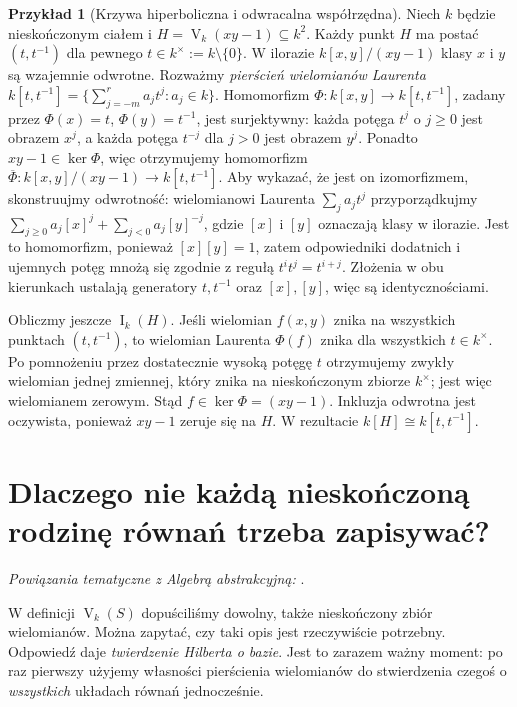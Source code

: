 \documentclass[11pt,a4paper,openany]{report}
\numberwithin{equation}{section}
\theoremstyle{plain}
\theoremstyle{definition}
\newtheorem{przyklad}[twierdzenie]{Przykład}
\theoremstyle{remark}
\newcommand{\V}{\operatorname V}
\newcommand{\I}{\operatorname I}
\newcommand{\kerf}{\operatorname{ker}}
\begin{document}
\begin{przyklad}[Krzywa hiperboliczna i odwracalna współrzędna]
Niech $k$ będzie nieskończonym ciałem i
$H=\V_k(xy-1)\subseteq k^2$. Każdy punkt $H$ ma postać
$(t,t^{-1})$ dla pewnego $t\in k^\times:=k\setminus\{0\}$.
W ilorazie $k[x,y]/(xy-1)$ klasy $x$ i $y$ są wzajemnie
odwrotne. Rozważmy \emph{pierścień wielomianów Laurenta}
$k[t,t^{-1}]=\{\sum_{j=-m}^r a_jt^j:a_j\in k\}$.
Homomorfizm $\Phi:k[x,y]\to k[t,t^{-1}]$, zadany przez
$\Phi(x)=t$, $\Phi(y)=t^{-1}$, jest surjektywny:
każda potęga $t^j$ o $j\ge0$ jest obrazem $x^j$, a każda
potęga $t^{-j}$ dla $j>0$ jest obrazem $y^j$.
Ponadto $xy-1\in\kerf\Phi$, więc otrzymujemy homomorfizm
$\overline\Phi:k[x,y]/(xy-1)\to k[t,t^{-1}]$.
Aby wykazać, że jest on izomorfizmem, skonstruujmy odwrotność:
wielomianowi Laurenta $\sum_j a_jt^j$ przyporządkujmy
$\sum_{j\ge0}a_j[x]^j+\sum_{j<0}a_j[y]^{-j}$,
gdzie $[x]$ i $[y]$ oznaczają klasy w ilorazie.
Jest to homomorfizm, ponieważ $[x][y]=1$, zatem
odpowiedniki dodatnich i ujemnych potęg mnożą się zgodnie
z regułą $t^it^j=t^{i+j}$. Złożenia w obu kierunkach
ustalają generatory $t,t^{-1}$ oraz $[x],[y]$, więc są identycznościami.

Obliczmy jeszcze $\I_k(H)$. Jeśli wielomian $f(x,y)$ znika na
wszystkich punktach $(t,t^{-1})$, to wielomian Laurenta
$\Phi(f)$ znika dla wszystkich $t\in k^\times$.
Po pomnożeniu przez dostatecznie wysoką potęgę $t$
otrzymujemy zwykły wielomian jednej zmiennej, który znika
na nieskończonym zbiorze $k^\times$; jest więc wielomianem zerowym.
Stąd $f\in\kerf\Phi=(xy-1)$. Inkluzja odwrotna jest
oczywista, ponieważ $xy-1$ zeruje się na $H$. W rezultacie
$k[H]\cong k[t,t^{-1}]$.
\end{przyklad}

\section{Dlaczego nie każdą nieskończoną rodzinę równań trzeba zapisywać?}

\noindent\emph{Powiązania tematyczne z Algebrą abstrakcyjną:} .


W definicji $\V_k(S)$ dopuściliśmy dowolny, także nieskończony
zbiór wielomianów. Można zapytać, czy taki opis jest rzeczywiście
potrzebny. Odpowiedź daje \emph{twierdzenie Hilberta o bazie}.
Jest to zarazem ważny moment: po raz pierwszy użyjemy własności
pierścienia wielomianów do stwierdzenia czegoś o \emph{wszystkich}
układach równań jednocześnie.
\end{document}

